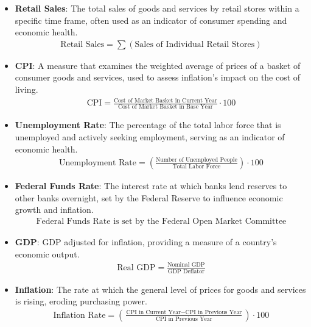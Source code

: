 \begin{itemize}
	\item \textbf{Retail Sales}: The total sales of goods and services by retail stores within a specific time frame, often used as an indicator of consumer spending and economic health.
	\begin{align} \text{Retail Sales} = \sum (\text{Sales of Individual Retail Stores}) \end{align}
	
	\item \textbf{\ac{CPI}}: A measure that examines the weighted average of prices of a basket of consumer goods and services, used to assess inflation's impact on the cost of living.
	\begin{align} \text{CPI} = \frac{\text{Cost of Market Basket in Current Year}}{\text{Cost of Market Basket in Base Year}} \cdot 100 \end{align}
	
	\item \textbf{Unemployment Rate}: The percentage of the total labor force that is unemployed and actively seeking employment, serving as an indicator of economic health.
	\begin{align} \text{Unemployment Rate} = \left( \frac{\text{Number of Unemployed People}}{\text{Total Labor Force}} \right) \cdot 100 \end{align}
	

	\item \textbf{Federal Funds Rate}: The interest rate at which banks lend reserves to other banks overnight, set by the Federal Reserve to influence economic growth and inflation.
	\begin{align} \text{Federal Funds Rate is set by the Federal Open Market Committee} \end{align}
	
	\clearpage
	
	\item \textbf{\ac{GDP}}: \ac{GDP} adjusted for inflation, providing a measure of a country's economic output.
	\begin{align} \text{Real GDP} = \frac{\text{Nominal GDP}}{\text{GDP Deflator}} \end{align}
	
	\item \textbf{Inflation}: The rate at which the general level of prices for goods and services is rising, eroding purchasing power.
	\begin{align} \text{Inflation Rate} = \left( \frac{\text{CPI in Current Year} - \text{CPI in Previous Year}}{\text{CPI in Previous Year}} \right) \cdot 100 \end{align}
\end{itemize}

